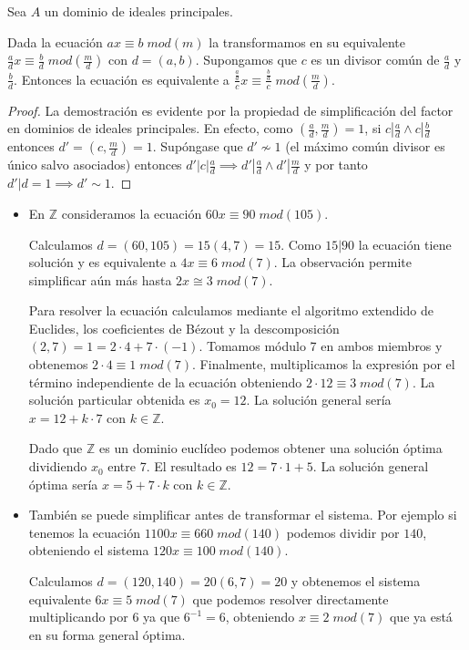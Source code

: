 \begin{proposition}
Sea $A$ un dominio de ideales principales.

Dada la ecuación $ax \equiv b \; mod(m)$ la transformamos en su equivalente $\frac{a}{d}x \equiv \frac{b}{d} \; mod(\frac{m}{d})$ con $d = (a,b)$. Supongamos que $c$ es un divisor común de $\frac{a}{d}$ y $\frac{b}{d}$. Entonces la ecuación es equivalente a $\frac{\frac{a}{d}}{c}x \equiv \frac{\frac{b}{d}}{c} \; mod(\frac{m}{d})$. 
\end{proposition}
\begin{proof}
La demostración es evidente por la propiedad de simplificación del factor en dominios de ideales principales. En efecto, como $(\frac{a}{d}, \frac{m}{d}) = 1$, si $c|\frac{a}{d} \land c| \frac{b}{d}$ entonces $d' = (c,\frac{m}{d}) = 1$. Supóngase que $d' \nsim 1$ (el máximo común divisor es único salvo asociados) entonces $d'|c|\frac{a}{d} \implies d'|\frac{a}{d} \land d'|\frac{m}{d}$ y por tanto $d'|d = 1 \implies d' \sim 1$.   
\end{proof}

\begin{example}
\begin{itemize}
\item En $\mathbb{Z}$ consideramos la ecuación $60x \equiv 90 \; mod(105)$. 

Calculamos $d = (60,105) = 15(4,7) = 15$. Como $15|90$ la ecuación tiene solución y es equivalente a $4x \equiv 6 \; mod(7)$. La observación permite simplificar aún más hasta $2x \cong 3 \; mod(7)$. 

Para resolver la ecuación calculamos mediante el algoritmo extendido de Euclides, los coeficientes de Bézout y la descomposición $(2,7) = 1 = 2 \cdot 4 + 7 \cdot (-1)$. Tomamos módulo 7 en ambos miembros y obtenemos $2 \cdot 4 \equiv 1 \; mod(7)$. Finalmente, multiplicamos la expresión por el término independiente de la ecuación obteniendo $2 \cdot 12 \equiv 3 \; mod(7)$. La solución particular obtenida es $x_0 = 12$. La solución general sería $x = 12 + k \cdot 7$ con $k \in \mathbb{Z}$.

Dado que $\mathbb{Z}$ es un dominio euclídeo podemos obtener una solución óptima dividiendo $x_0$ entre 7. El resultado es $12 = 7 \cdot 1 + 5$. La solución general óptima sería $x = 5 + 7 \cdot k$ con $k \in \mathbb{Z}$.

\item También se puede simplificar antes de transformar el sistema. Por ejemplo si tenemos la ecuación $1100x \equiv 660 \; mod(140)$ podemos dividir por $140$, obteniendo el sistema $120x \equiv 100 \; mod(140)$. 

Calculamos $d = (120,140) = 20(6,7) = 20$ y obtenemos el sistema equivalente $6x \equiv 5 \; mod(7)$ que podemos resolver directamente multiplicando por $6$ ya que $6^{-1} = 6$, obteniendo $x \equiv 2 \; mod(7)$ que ya está en su forma general óptima. 
\end{itemize}
\end{example}

